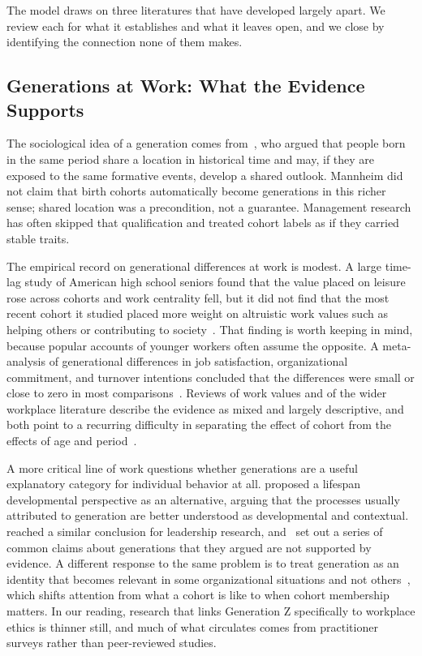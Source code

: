 The model draws on three literatures that have developed largely apart. We review each for what it establishes and what it leaves open, and we close by identifying the connection none of them makes.

\subsection{Generations at Work: What the Evidence Supports}

The sociological idea of a generation comes from~\citet{mannheim1952problem}, who argued that people born in the same period share a location in historical time and may, if they are exposed to the same formative events, develop a shared outlook. Mannheim did not claim that birth cohorts automatically become generations in this richer sense; shared location was a precondition, not a guarantee. Management research has often skipped that qualification and treated cohort labels as if they carried stable traits.

The empirical record on generational differences at work is modest. A large time-lag study of American high school seniors found that the value placed on leisure rose across cohorts and work centrality fell, but it did not find that the most recent cohort it studied placed more weight on altruistic work values such as helping others or contributing to society~\citep{twenge2010generational}. That finding is worth keeping in mind, because popular accounts of younger workers often assume the opposite. A meta-analysis of generational differences in job satisfaction, organizational commitment, and turnover intentions concluded that the differences were small or close to zero in most comparisons~\citep{costanza2012generational}. Reviews of work values and of the wider workplace literature describe the evidence as mixed and largely descriptive, and both point to a recurring difficulty in separating the effect of cohort from the effects of age and period~\citep{parry2011generational,lyons2014generational}.

A more critical line of work questions whether generations are a useful explanatory category for individual behavior at all. \citet{rudolph2017considering} proposed a lifespan developmental perspective as an alternative, arguing that the processes usually attributed to generation are better understood as developmental and contextual. \citet{rudolph2018leadership} reached a similar conclusion for leadership research, and~\citet{rudolph2021generations} set out a series of common claims about generations that they argued are not supported by evidence. A different response to the same problem is to treat generation as an identity that becomes relevant in some organizational situations and not others~\citep{joshi2010unpacking}, which shifts attention from what a cohort is like to when cohort membership matters. In our reading, research that links Generation Z specifically to workplace ethics is thinner still, and much of what circulates comes from practitioner surveys rather than peer-reviewed studies.

